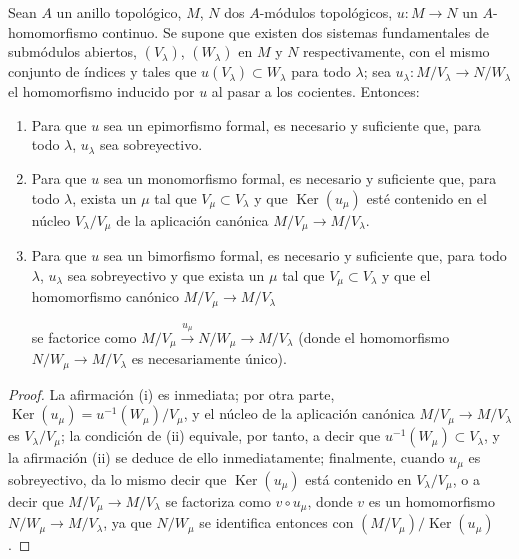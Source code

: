 \begin{proposition}[19.1.3]
\label{0.19.1.3-fr}
Sean $A$ un anillo topológico, $M$, $N$ dos $A$-módulos topológicos,
$u:M\to N$ un $A$-homomorfismo continuo. Se supone que existen dos sistemas
fundamentales de submódulos abiertos, $(V_\lambda)$, $(W_\lambda)$ en $M$ y
$N$ respectivamente, con el mismo conjunto de índices y tales que
$u(V_\lambda)\subset W_\lambda$ para todo $\lambda$; sea
$u_\lambda:M/V_\lambda\to N/W_\lambda$ el homomorfismo inducido por $u$ al
pasar a los cocientes. Entonces:
\begin{enumerate}
  \item[\textup{(i)}] Para que $u$ sea un epimorfismo formal, es necesario y suficiente que,
  para todo $\lambda$, $u_\lambda$ sea sobreyectivo.
  \item[\textup{(ii)}] Para que $u$ sea un monomorfismo formal, es necesario y suficiente
  que, para todo $\lambda$, exista un $\mu$ tal que
  $V_\mu\subset V_\lambda$ y que $\operatorname{Ker}(u_\mu)$ esté contenido
  en el núcleo $V_\lambda/V_\mu$ de la aplicación canónica
  $M/V_\mu\to M/V_\lambda$.
  \item[\textup{(iii)}] Para que $u$ sea un bimorfismo formal, es necesario y suficiente
  que, para todo $\lambda$, $u_\lambda$ sea sobreyectivo y que exista un
  $\mu$ tal que $V_\mu\subset V_\lambda$ y que el homomorfismo canónico
  $M/V_\mu\to M/V_\lambda$


  \noindent se factorice como
  $M/V_\mu\xrightarrow{u_\mu}N/W_\mu\to M/V_\lambda$ (donde
  el homomorfismo $N/W_\mu\to M/V_\lambda$ es necesariamente único).
\end{enumerate}
\end{proposition}

\begin{proof}
La afirmación (i) es inmediata; por otra parte,
$\operatorname{Ker}(u_\mu)=u^{-1}(W_\mu)/V_\mu$, y el núcleo de la aplicación
canónica $M/V_\mu\to M/V_\lambda$ es $V_\lambda/V_\mu$; la condición de
(ii) equivale, por tanto, a decir que $u^{-1}(W_\mu)\subset V_\lambda$, y la afirmación
(ii) se deduce de ello inmediatamente; finalmente, cuando $u_\mu$ es sobreyectivo, da lo mismo
decir que $\operatorname{Ker}(u_\mu)$ está contenido en
$V_\lambda/V_\mu$, o a decir que $M/V_\mu\to M/V_\lambda$ se factoriza como
$v\circ u_\mu$, donde $v$ es un homomorfismo
$N/W_\mu\to M/V_\lambda$, ya que $N/W_\mu$ se identifica entonces con
$(M/V_\mu)/\operatorname{Ker}(u_\mu)$.
\end{proof}

